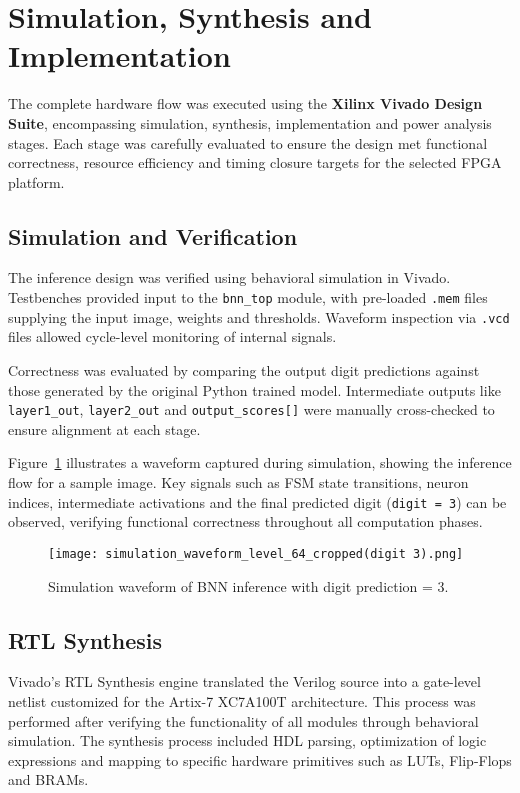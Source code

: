 \documentclass[a4paper,12pt]{report}
\begin{document}
\clearpage
\section{Simulation, Synthesis and Implementation}
The complete hardware flow was executed using the \textbf{Xilinx Vivado Design Suite}, encompassing simulation, synthesis, implementation and power analysis stages. Each stage was carefully evaluated to ensure the design met functional correctness, resource efficiency and timing closure targets for the selected FPGA platform.

\subsection{Simulation and Verification}
The inference design was verified using behavioral simulation in Vivado. Testbenches provided input to the \texttt{bnn\_top} module, with pre-loaded \texttt{.mem} files supplying the input image, weights and thresholds. Waveform inspection via \texttt{.vcd} files allowed cycle-level monitoring of internal signals.

Correctness was evaluated by comparing the output digit predictions against those generated by the original Python trained model. Intermediate outputs like \texttt{layer1\_out}, \texttt{layer2\_out} and \texttt{output\_scores[]} were manually cross-checked to ensure alignment at each stage.

Figure~\ref{fig:sim_waveform} illustrates a waveform captured during simulation, showing the inference flow for a sample image. Key signals such as FSM state transitions, neuron indices, intermediate activations and the final predicted digit (\texttt{digit = 3}) can be observed, verifying functional correctness throughout all computation phases.

\begin{figure}[H]
    \centering
    \texttt{[image: simulation\_waveform\_level\_64\_cropped(digit 3).png]}
    \caption{Simulation waveform of BNN inference with digit prediction = 3.}
    \label{fig:sim_waveform}
\end{figure}

\clearpage
\subsection{RTL Synthesis}
Vivado's RTL Synthesis engine translated the Verilog source into a gate-level netlist customized for the Artix-7 XC7A100T architecture. This process was performed after verifying the functionality of all modules through behavioral simulation. The synthesis process included HDL parsing, optimization of logic expressions and mapping to specific hardware primitives such as LUTs, Flip-Flops and BRAMs.
\end{document}
